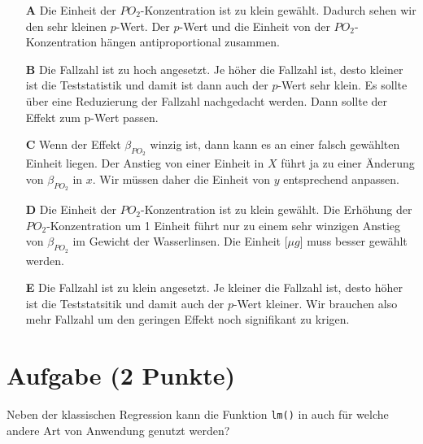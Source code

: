 \documentclass[a4paper, 9pt]{scrartcl}\usepackage[]{graphicx}\usepackage[]{xcolor}
\begin{document}
\begin{enumerate}
\item [\textbf{A} \msquare] Die Einheit der $PO_2$-Konzentration ist zu klein gewählt. Dadurch sehen wir den sehr kleinen $p$-Wert. Der $p$-Wert und die Einheit von der $PO_2$-Konzentration hängen antiproportional zusammen.
\item [\textbf{B} \msquare] Die Fallzahl ist zu hoch angesetzt. Je höher die Fallzahl ist, desto kleiner ist die Teststatistik und damit ist dann auch der $p$-Wert sehr klein. Es sollte über eine Reduzierung der Fallzahl nachgedacht werden. Dann sollte der Effekt zum p-Wert passen.
\item [\textbf{C} \msquare] Wenn der Effekt $\beta_{PO_2}$ winzig ist, dann kann es an einer falsch gewählten Einheit liegen. Der Anstieg von einer Einheit in $X$ führt ja zu einer Änderung von $\beta_{PO_2}$ in $x$. Wir müssen daher die Einheit von $y$ entsprechend anpassen.
\item [\textbf{D} \msquare] Die Einheit der $PO_2$-Konzentration ist zu klein gewählt. Die Erhöhung der $PO_2$-Konzentration um 1 Einheit führt nur zu einem sehr winzigen Anstieg von $\beta_{PO_2}$ im Gewicht der Wasserlinsen. Die Einheit [$\mu g$] muss besser gewählt werden.
\item [\textbf{E} \msquare] Die Fallzahl ist zu klein angesetzt. Je kleiner die Fallzahl ist, desto höher ist die Teststatsitik und damit auch der $p$-Wert kleiner. Wir brauchen also mehr Fallzahl um den geringen Effekt noch signifikant zu krigen.
\end{enumerate}

\section{Aufgabe \hfill (2 Punkte)}



Neben der klassischen Regression kann die Funktion \texttt{lm()} in \Rlogo auch für welche andere Art von Anwendung genutzt werden?
\end{document}
